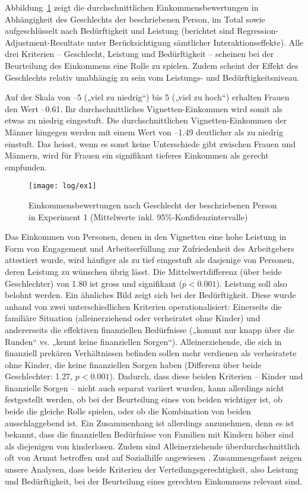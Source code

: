 \documentclass[a4paper,12pt]{article}
\begin{document}
Abbildung~\ref{fig-ex1} zeigt die durchschnittlichen Einkommensbewertungen in
Abhängigkeit des Geschlechts der beschriebenen Person, im Total sowie
aufgeschlüsselt nach Bedürftigkeit und Leistung (berichtet sind Regression-Adjustment-Resultate unter 
Berücksichtigung sämtlicher Interaktionseffekte). Alle drei Kriterien --
Geschlecht, Leistung und Bedürftigkeit -- scheinen bei der Beurteilung des
Einkommens eine Rolle zu spielen. Zudem scheint der Effekt des Geschlechts
relativ unabhängig zu sein vom Leistungs- und Bedürftigkeitsniveau.


Auf der Skala von --5 („viel zu niedrig“) bis 5 („viel zu hoch“) erhalten
Frauen den Wert --0.61. Ihr durchschnittliches Vignetten-Einkommen wird somit
als etwas zu niedrig eingestuft. Die durchschnittlichen Vignetten-Einkommen der
Männer hingegen werden mit einem Wert von --1.49 deutlicher als zu niedrig
einstuft. Das heisst, wenn es sonst keine Unterschiede gibt zwischen Frauen und
Männern, wird für Frauen ein signifikant tieferes Einkommen als gerecht
empfunden.

\begin{figure}\centering
    \texttt{[image: log/ex1]}
    \caption{Einkommensbewertungen nach Geschlecht der beschriebenen Person 
    in Experiment 1 (Mittelwerte inkl. 95\%-Konfidenzintervalle)}\label{fig-ex1}
\end{figure}


Das Einkommen von Personen, denen in den Vignetten eine hohe Leistung in Form
von Engagement und Arbeitserfüllung zur Zufriedenheit des Arbeitgebers
attestiert wurde, wird häufiger als zu tief eingestuft als dasjenige von
Personen, deren Leistung zu wünschen übrig lässt. Die Mittelwertdifferenz (über
beide Geschlechter) von 1.80 ist gross und signifikant ($p<0.001$). Leistung
soll also belohnt werden. Ein ähnliches Bild zeigt sich bei der Bedürftigkeit.
Diese wurde anhand von zwei unterschiedlichen Kriterien operationalisiert:
Einerseits die familiäre Situation (alleinerziehend oder verheiratet ohne
Kinder) und andererseits die effektiven finanziellen Bedürfnisse („kommt nur
knapp über die Runden“ vs. „kennt keine finanziellen Sorgen“).
Alleinerziehende, die sich in finanziell prekären Verhältnissen befinden sollen
mehr verdienen als verheiratete ohne Kinder, die keine finanziellen Sorgen
haben (Differenz über beide Geschlechter: 1.27, $p<0.001$). Dadurch, dass diese
beiden Kriterien – Kinder und finanzielle Sorgen – nicht auch separat variiert
wurden, kann allerdings nicht festgestellt werden, ob bei der Beurteilung eines
von beiden wichtiger ist, ob beide die gleiche Rolle spielen, oder ob die
Kombination von beiden ausschlaggebend ist. Ein Zusammenhang ist allerdings
anzunehmen, denn es ist bekannt, dass die finanziellen Bedürfnisse von Familien
mit Kindern höher sind als diejenigen von kinderlosen. Zudem sind
Alleinerziehende überdurchschnittlich oft von Armut betroffen und auf
Sozialhilfe angewiesen \citep{Amacker-etal-2015}. Zusammengefasst zeigen unsere
Analysen, dass beide Kriterien der Verteilungsgerechtigkeit, also Leistung und
Bedürftigkeit, bei der Beurteilung eines gerechten Einkommens relevant sind.
\end{document}

